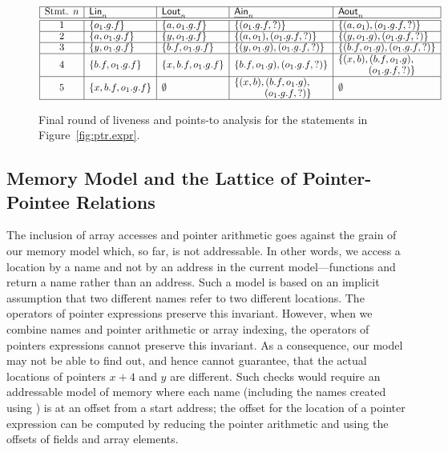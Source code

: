 \documentclass[a4paper,11pt,fleqn]{article}
\newcommand{\lin}{\text{{\sf\em Lin\/}}\xspace}
\newcommand{\ain}{\text{{\sf\em Ain\/}}\xspace}
\newcommand{\lout}{\text{{\sf\em Lout\/}}\xspace}
\newcommand{\aout}{\text{{\sf\em Aout\/}}\xspace}
\begin{document}
\begin{figure}[t]
\begin{center}
$
\begin{array}{|c|l|l|l|l|}
\hline
\text{Stmt. $n$}
	& \lin_n
	& \lout_n
	& \ain_n
	& \aout_n
	\\ \hline\hline
1 
	& \{ o_1.g.f \} 
	& \{ a,o_1.g.f \} 
	& \{ (o_1.g.f,?) \}
	& \{ (a,o_1),(o_1.g.f,?) \}
	\\ \hline
2 
	& \{ a,o_1.g.f \} 
	& \{ y,o_1.g.f \} 
	& \{ (a,o_1),(o_1.g.f,?) \} 
	& \{ (y, o_1.g),(o_1.g.f,?) \}
	\\ \hline
3 
	& \{ y,o_1.g.f \} 
	& \{ b.f,o_1.g.f \} 
	& \{ (y,o_1.g),(o_1.g.f,?) \} 
	& \{ (b.f,o_1.g),(o_1.g.f,?) \}
	\\ \hline
4 
	& \{ b.f,o_1.g.f \} 
	& \{ x,b.f,o_1.g.f \} 
	& \{ b.f,o_1.g),(o_1.g.f,?) \} 
	& 
		\renewcommand{\arraystretch}{.9}
		\begin{array}{@{}r@{}}
		\{ (x,b),(b.f,o_1.g),\strut
			\\
		(o_1.g.f,?) \}
		\end{array}
	\\ \hline
5 
	& \{ x,b.f,o_1.g.f \} 
	& \emptyset 
	& 
		\renewcommand{\arraystretch}{.9}
		\begin{array}{@{}r@{}}
		\{ (x,b),(b.f,o_1.g),\strut
			\\
		(o_1.g.f,?) \} 
		\end{array}
	& \emptyset
	\\ \hline
\end{array}
$
\end{center}

\caption{Final round of liveness and points-to analysis for the statements in
Figure~\protect\ref{fig:ptr.expr}.}
\label{fig:data.flow.values}
\end{figure}

\subsection{Memory Model and the Lattice of Pointer-Pointee Relations}
\label{sec:mem.model.array}

The inclusion of array accesses and pointer arithmetic goes
against the grain of our memory model which, so far, is not addressable.
In other words, we access a location by a name and not by an address
in the current model---functions \lval and \rval return a name rather than
an address. Such a model is based on an implicit assumption that two
different names refer to two different locations. The operators of
pointer expressions preserve this invariant. However, when we combine
names and pointer arithmetic or array indexing, the operators of
pointers expressions cannot preserve this invariant. As a consequence,
our model may not be able to find out, and hence cannot guarantee, that
the actual locations of pointers $x+4$ and $y$ are different. Such
checks would require an addressable model of memory where each name
(including the names created using \lval) is at an offset from a start
address; the offset for the location of a pointer expression can be
computed by reducing the pointer arithmetic and using the offsets of
fields and array elements.
\end{document}
